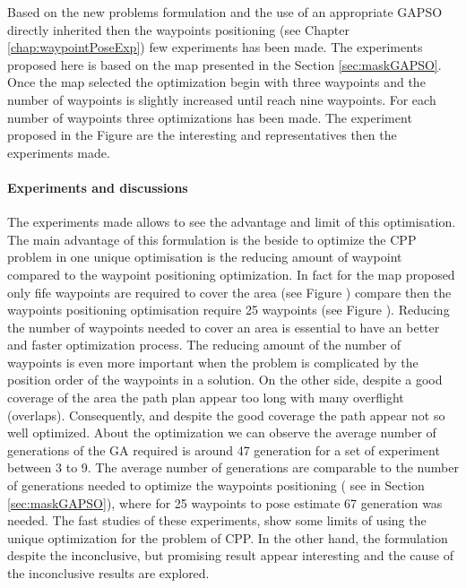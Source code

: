 		
	Based on the new problems formulation and the use of an appropriate GAPSO directly inherited then the waypoints positioning (see Chapter \ref{chap:waypointPoseExp}) few experiments has been made. The experiments proposed here is based on the map presented in the Section \ref{sec:maskGAPSO}.
  Once the map selected the optimization begin with three waypoints and the number of waypoints is slightly increased until reach nine waypoints. For each number of waypoints  three optimizations has been made. The experiment proposed in the Figure  are the interesting and representatives then the experiments made. 

	\paragraph*{Experiments and discussions}	
The experiments made allows to see the advantage and limit of this optimisation. 
The main advantage of this formulation is the beside to optimize the CPP problem in one unique optimisation is the reducing amount of waypoint compared to the waypoint positioning optimization. In fact for the map proposed only  fife waypoints are required to cover  the area (see Figure ) compare then the waypoints positioning optimisation require 25 waypoints (see Figure ). Reducing the number of waypoints needed to cover an area is essential to have an better and faster optimization process. The reducing amount of the number of waypoints is even more important when the problem is complicated by the position order of the waypoints in a solution. 
	On the other side, despite a good coverage of the area the path plan appear too long with many overflight (overlaps). Consequently, and despite the good  coverage the path appear not so well optimized. 
	About the optimization we can observe the average number of generations of the GA required is around 47 generation for a set of experiment between 3 to 9. The average number of generations  are  comparable to the number of generations needed to optimize the waypoints positioning ( see in Section \ref{sec:maskGAPSO}), where for 25 waypoints to pose estimate 67 generation was needed. 
	The fast studies of these experiments, show some limits of using the unique optimization for the problem of CPP. In the other hand, the formulation despite the inconclusive, but promising result appear interesting and the cause of the inconclusive results are explored.
	
